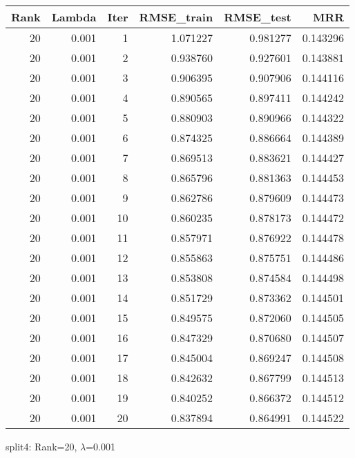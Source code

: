 \begin{tabular}{rrrrrr}
\toprule
 Rank &  Lambda &  Iter &  RMSE\_train &  RMSE\_test &       MRR \\
\midrule
   20 &   0.001 &     1 &    1.071227 &   0.981277 &  0.143296 \\
   20 &   0.001 &     2 &    0.938760 &   0.927601 &  0.143881 \\
   20 &   0.001 &     3 &    0.906395 &   0.907906 &  0.144116 \\
   20 &   0.001 &     4 &    0.890565 &   0.897411 &  0.144242 \\
   20 &   0.001 &     5 &    0.880903 &   0.890966 &  0.144322 \\
   20 &   0.001 &     6 &    0.874325 &   0.886664 &  0.144389 \\
   20 &   0.001 &     7 &    0.869513 &   0.883621 &  0.144427 \\
   20 &   0.001 &     8 &    0.865796 &   0.881363 &  0.144453 \\
   20 &   0.001 &     9 &    0.862786 &   0.879609 &  0.144473 \\
   20 &   0.001 &    10 &    0.860235 &   0.878173 &  0.144472 \\
   20 &   0.001 &    11 &    0.857971 &   0.876922 &  0.144478 \\
   20 &   0.001 &    12 &    0.855863 &   0.875751 &  0.144486 \\
   20 &   0.001 &    13 &    0.853808 &   0.874584 &  0.144498 \\
   20 &   0.001 &    14 &    0.851729 &   0.873362 &  0.144501 \\
   20 &   0.001 &    15 &    0.849575 &   0.872060 &  0.144505 \\
   20 &   0.001 &    16 &    0.847329 &   0.870680 &  0.144507 \\
   20 &   0.001 &    17 &    0.845004 &   0.869247 &  0.144508 \\
   20 &   0.001 &    18 &    0.842632 &   0.867799 &  0.144513 \\
   20 &   0.001 &    19 &    0.840252 &   0.866372 &  0.144512 \\
   20 &   0.001 &    20 &    0.837894 &   0.864991 &  0.144522 \\
\bottomrule
\end{tabular}

\caption{split4: Rank=20, $\lambda$=0.001}
